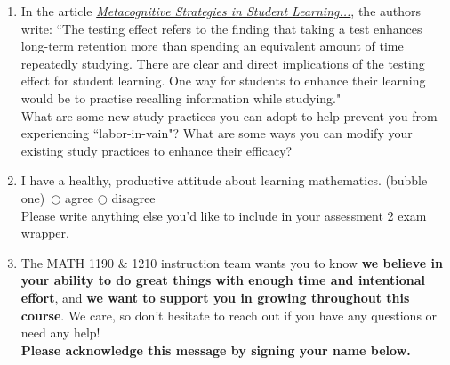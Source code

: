 \documentclass[10pt]{article}
\begin{document}
\begin{enumerate}
Do you feel like you sometimes ``labor-in-vain" while studying for calculus? Which of your study practices do you think contribute to this feeling?

\vfill

\newpage%

    
\item In the article {\it\color{blue}\href{https://learninglab.psych.purdue.edu/downloads/2009/2009_Karpicke_Butler_Roediger.pdf}{Metacognitive Strategies in Student Learning...}}, the authors write: ``The testing effect refers to the finding that taking a test enhances long-term retention more than spending an equivalent amount of time repeatedly studying. There are clear and direct implications of the testing effect for student learning. One way for students to enhance their learning would be to practise recalling information while studying."\\

What are some new study practices you can adopt to help prevent you from experiencing ``labor-in-vain"? What are some ways you can modify your existing study practices to enhance their efficacy? 

    \vfill

\item I have a healthy, productive attitude about learning mathematics. (bubble one) \,\hfill $\bigcirc$ agree \hfill $\bigcirc$ disagree \hfill\,\\[0.1in]
%
Please write anything else you'd like to include in your assessment 2 exam wrapper.

    \vfill

\item The MATH 1190 \& 1210 instruction team wants you to know {\bf we believe in your ability to do great things with enough time and intentional effort}, and {\bf we want to support you in growing throughout this course}. We care, so don't hesitate to reach out if you have any questions or need any help!\\ 

{\bf Please acknowledge this message by signing your name below.}\\[0.5in]
    
\end{enumerate}
\end{document}
